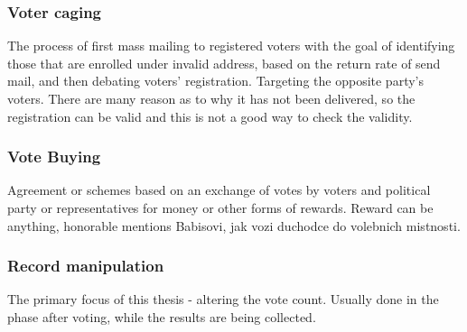 \subsubsection*{Voter caging} %
The process of first mass mailing to registered voters with the goal of identifying those that are enrolled under invalid address, based on the return rate of send mail, and then debating voters' registration. Targeting the opposite party's voters. There are many reason as to why it has not been delivered, so the registration can be valid and this is not a good way to check the validity. \cite{Levitt2007}

\subsubsection*{Vote Buying} 
Agreement or schemes based on an exchange of votes by voters and political party or representatives for money or other forms of rewards. Reward can be anything, honorable mentions Babisovi, jak vozi duchodce do volebnich mistnosti. \cite{Lebeda2021, Levitt2007, The_Heritage_Foundation_2024}



\subsubsection*{Record manipulation}
The primary focus of this thesis - altering the vote count. Usually done in the phase after voting, while the results are being collected. \cite{Lebeda2021, The_Heritage_Foundation_2024}




